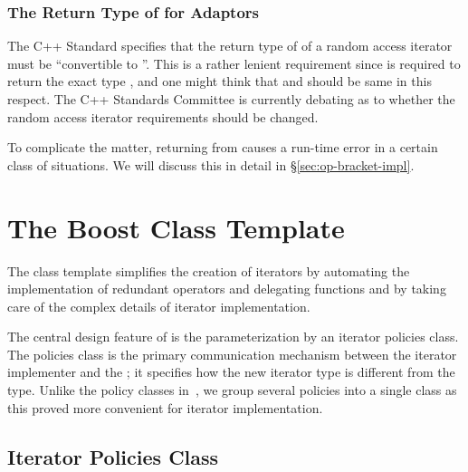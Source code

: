 \documentclass{netobjectdays}
\begin{document}
\subsubsection{The Return Type of  for Adaptors}
\label{sec:operator-bracket}

The C++ Standard specifies that the return type of 
of a random access iterator must be ``convertible to ''.  This
is a rather lenient requirement since  is required to
return the exact type , and one might think that
 and  should be same in this respect.
The C++ Standards Committee is currently debating as to whether the
random access iterator requirements should be changed.

To complicate the matter, returning  from 
causes a run-time error in a certain class of situations. We will
discuss this in detail in \S\ref{sec:op-bracket-impl}.




\section{The Boost  Class Template}

The  class template simplifies the creation
of iterators by automating the implementation of redundant operators
and delegating functions and by taking care of the complex details of
iterator implementation.

The central design feature of  is the
parameterization by an iterator policies class. The policies class is
the primary communication mechanism between the iterator implementer
and the ; it specifies how the new iterator
type is different from the  type. Unlike the policy classes
in~\cite{alexandrescu01:_modern_cpp_design}, we group several policies
into a single class as this proved more convenient for iterator
implementation.

\subsection{Iterator Policies Class}
\end{document}
